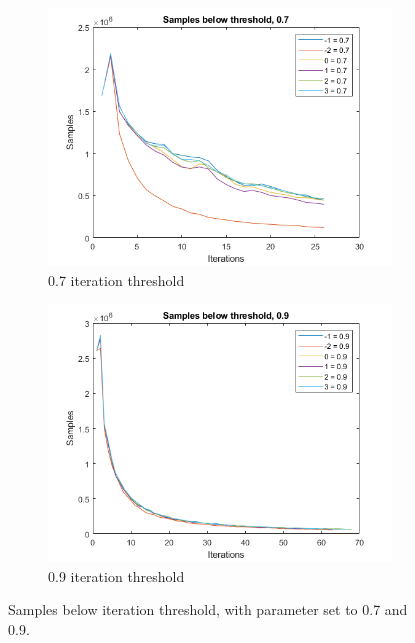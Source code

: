 \begin{figure}
    \centering
    \begin{subfigure}[b]{.45\textwidth}
        \centering
        \includegraphics[width=\textwidth]{figures/iterbelow-0.7.png}
        \caption{0.7 iteration threshold}
        \label{sfig:iter:iterbelow0.7}
    \end{subfigure}
    \hfill
    \begin{subfigure}[b]{.45\textwidth}
        \centering
        \includegraphics[width=\textwidth]{figures/iterbelow-0.9.png}
        \caption{0.9 iteration threshold}
        \label{sfig:iter:iterbelow0.9}
    \end{subfigure}
    \caption{Samples below iteration threshold, with parameter set to 0.7 and 0.9.}
    \label{fig:iter:iterbelow0.70.9}
\end{figure}

